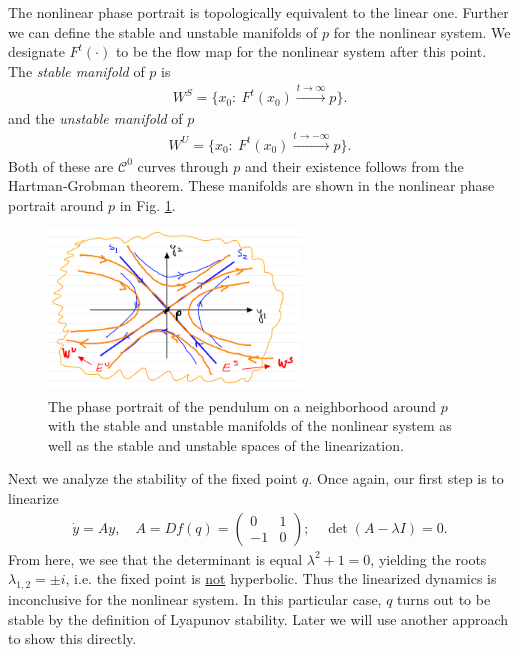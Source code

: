 \begin{ex}
The nonlinear phase portrait is topologically equivalent to the linear one. Further we can define the stable and unstable manifolds of ${p} $ for the nonlinear system. We designate $F^{t}(\cdot)$ to be the flow map for the nonlinear system after this point.
The \emph{stable manifold} of ${p} $ is 
\begin{align}
	\boxed{
	W^{S} = \{ {x_0} :\ F^{t}({x_0} ) \xrightarrow{t \to \infty}{p} \}.
}
\end{align}
and the \emph{unstable manifold} of ${p} $
\begin{align}
	\boxed{
	W^{U}=\{{x_0} :\ F^{t}({x_0} ) \xrightarrow{t \to - \infty}{p}\}.
}
\end{align}
Both of these are $\mathcal{C}^{0}$ curves through ${p}$ and their existence follows from the Hartman-Grobman theorem. These manifolds are shown in the nonlinear phase portrait around ${p} $ in Fig. \ref{fig:nonlin_pend_phase_p}. 
\begin{figure}[h!]
	\centering
	\includegraphics[width=0.6\textwidth]{figures/ch2/18nonlin_pend_phase_p.png}
	\caption{The phase portrait of the pendulum on a neighborhood around ${p} $ with the stable and unstable manifolds of the nonlinear system as well as the stable and unstable spaces of the linearization.}
	\label{fig:nonlin_pend_phase_p}
\end{figure}

Next we analyze the stability of the fixed point $q$. Once again, our first step is to linearize
\begin{align}
	\dot{y} = Ay, \quad A = Df(q) = 
	\begin{pmatrix}
		0 & 1 \\ -1 & 0
	\end{pmatrix}
	;\quad \det (A- \lambda I) = 0.
\end{align}
From here, we see that the determinant is equal $\lambda^2 + 1 = 0$, yielding the roots $\lambda_{1,2}= \pm i$, i.e. the fixed point is \underline{not} hyperbolic. Thus the linearized dynamics is inconclusive for the nonlinear system. In this particular case, $q$ turns out to be stable by the definition of Lyapunov stability. Later we will use another approach to show this directly.
\end{ex}

